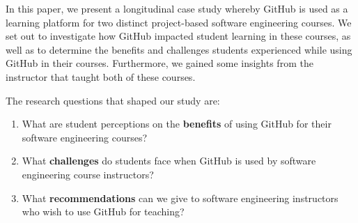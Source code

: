 


In this paper, we present a longitudinal case study whereby GitHub is used as a learning platform for two distinct project-based software engineering courses. We set out to investigate how GitHub impacted student learning in these courses, as well as to determine the benefits and challenges students experienced while using GitHub in their courses. Furthermore, we gained some insights from the instructor that taught both of these courses.
%

The research questions that shaped our study are:
\begin{enumerate}
\item What are student perceptions on the \textbf{benefits} of using GitHub for their software engineering courses?
\item What \textbf{challenges} do students face when GitHub is used by software engineering course instructors?
\item What \textbf{recommendations} can we give to software engineering instructors who wish to use GitHub for teaching?
\end{enumerate}

